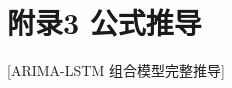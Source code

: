 \documentclass[12pt,a4paper]{ctexart}
\begin{document}
% 


\section{附录3 公式推导}
[ARIMA-LSTM 组合模型完整推导]
\end{document}
